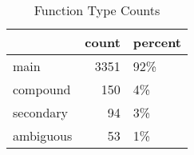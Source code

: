 \begin{table}[htbp!]
\centering
\caption{Function Type Counts}
\label{table:ALL_functype_cp}
\begin{tabular}{lrl}
\toprule
{} &  count & percent \\
\midrule
main      &   3351 &     92\% \\
compound  &    150 &      4\% \\
secondary &     94 &      3\% \\
ambiguous &     53 &      1\% \\
\bottomrule
\end{tabular}
\end{table}
